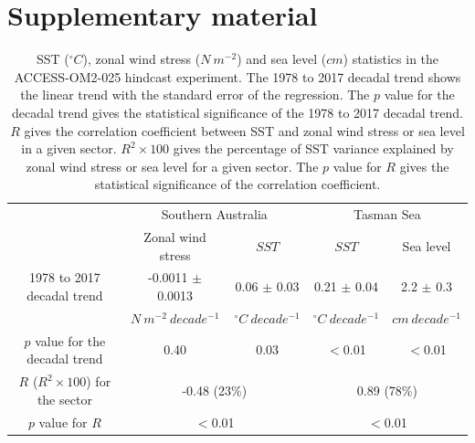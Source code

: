 \documentclass[draft,linenumbers]{agujournal2018}
\begin{document}
\section{Supplementary material}
\begin{table}
\caption{SST ($^{\circ}C$), zonal wind stress ($N\ m^{-2}$) and sea level ($cm$) statistics in the ACCESS-OM2-025 hindcast experiment. The 1978 to 2017 decadal trend shows the linear trend with the standard error of the regression. The $p$ value for the decadal trend gives the statistical significance of the 1978 to 2017 decadal trend. $R$ gives the correlation coefficient between SST and zonal wind stress or sea level in a given sector. $R^2 \times 100$ gives the percentage of SST variance explained by zonal wind stress or sea level for a given sector. The $p$ value for $R$ gives the statistical significance of the correlation coefficient.}
\centering
\begin{tabular}{c c c c c}
\hline
  & \multicolumn{2}{c}{Southern Australia} & \multicolumn{2}{c}{Tasman Sea} \\
  & Zonal wind stress  & $SST$ & $SST$ & Sea level\\
\hline
  1978 to 2017 decadal trend & -0.0011 $\pm$ 0.0013 & 0.06 $\pm$ 0.03 & 0.21 $\pm$ 0.04 & 2.2 $\pm$ 0.3 \\
  & $N\ m^{-2}\ decade^{-1}$ & $^{\circ}C\ decade^{-1}$ & $^{\circ}C\ decade^{-1}$ & $cm\ decade^{-1}$ \\
  $p$ value for the decadal trend & 0.40 & 0.03 & $<$0.01 & $<$0.01 \\
  $R$ ($R^2 \times 100$) for the sector & \multicolumn{2}{c}{-0.48 (23\%)} & \multicolumn{2}{c}{0.89 (78\%)} \\
  $p$ value for $R$ & \multicolumn{2}{c}{$<$0.01} & \multicolumn{2}{c}{$<$0.01} \\
\hline
\end{tabular}
\label{Table3}
\end{table}
\end{document}
